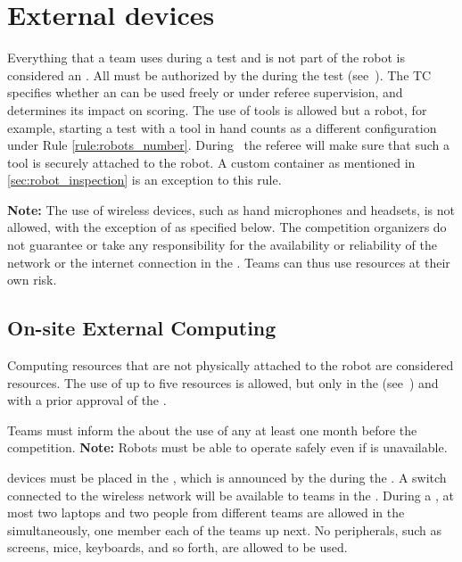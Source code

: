 \section{External devices}\label{rule:robot_external_devices}

Everything that a team uses during a test and is not part of the robot is considered an \ExternalDevice{}.
All \ExternalDevices{} must be authorized by the \TC{} during the \RobotInspection{} test (see~).
The TC specifies whether an \ExternalDevice{} can be used freely or under referee supervision, and determines its impact on scoring.
The use of tools is allowed but a robot, for example, starting a test with a tool in hand counts as a different configuration under Rule \ref{rule:robots_number}. During \RobotInspection \ the referee will make sure that such a tool is securely attached to the robot. 
A custom container as mentioned in \ref{sec:robot_inspection} is an exception to this rule.

\textbf{Note:} The use of wireless devices, such as hand microphones and headsets, is not allowed, with the exception of \ExternalComputing{} as specified below.
The competition organizers do not guarantee or take any responsibility for the availability or reliability of the network or the internet connection in the \Arena{}.
Teams can thus use \ExternalComputing{} resources at their own risk.

\subsection{On-site External Computing}

Computing resources that are not physically attached to the robot are considered \ExternalComputing{} resources.
The use of up to five \ExternalComputing{} resources is allowed, but only in the \ArenaNetwork{} (see~) and with a prior approval of the \TC{}.

Teams must inform the \TC{} about the use of any \ExternalComputing{} at least one month before the competition.
\textbf{Note:} Robots must be able to operate safely even if \ExternalComputing{} is unavailable.

\ExternalComputing{} devices must be placed in the \ECRA{}, which is announced by the \TC{} during the \SetupDays{}.
A switch connected to the \Arena{} wireless network will be available to teams in the \ECRA{}.
During a \Testblock{}, at most two laptops and two people from different teams are allowed in the \ECRA{} simultaneously, one member each of the teams up next.
No peripherals, such as screens, mice, keyboards, and so forth, are allowed to be used.

